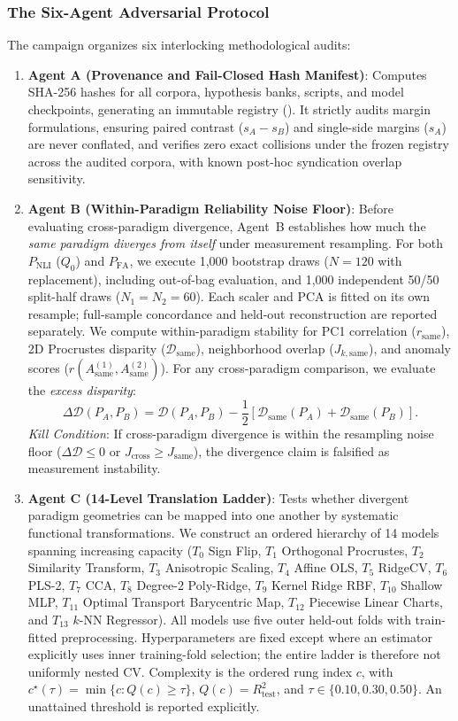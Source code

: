 \subsubsection{The Six-Agent Adversarial Protocol}
The campaign organizes six interlocking methodological audits:
\begin{enumerate}
    \item \textbf{Agent A (Provenance and Fail-Closed Hash Manifest)}: Computes SHA-256 hashes for all corpora, hypothesis banks, scripts, and model checkpoints, generating an immutable registry (). It strictly audits margin formulations, ensuring paired contrast ($s_A - s_B$) and single-side margins ($s_A$) are never conflated, and verifies zero exact collisions under the frozen registry across the audited corpora, with known post-hoc syndication overlap sensitivity.
    \item \textbf{Agent B (Within-Paradigm Reliability Noise Floor)}: Before evaluating cross-paradigm divergence, Agent~B establishes how much the \emph{same paradigm diverges from itself} under measurement resampling. For both $P_{\mathrm{NLI}}$ ($Q_0$) and $P_{\mathrm{FA}}$, we execute 1,000 bootstrap draws ($N=120$ with replacement), including out-of-bag evaluation, and 1,000 independent 50/50 split-half draws ($N_1=N_2=60$). Each scaler and PCA is fitted on its own resample; full-sample concordance and held-out reconstruction are reported separately. We compute within-paradigm stability for PC1 correlation ($r_{\text{same}}$), 2D Procrustes disparity ($\mathcal{D}_{\text{same}}$), neighborhood overlap ($J_{k,\text{same}}$), and anomaly scores ($r(A_{\text{same}}^{(1)}, A_{\text{same}}^{(2)})$). For any cross-paradigm comparison, we evaluate the \emph{excess disparity}:
    \begin{equation}
        \Delta \mathcal{D}(P_A, P_B) = \mathcal{D}(P_A, P_B) - \frac{1}{2}\left[\mathcal{D}_{\text{same}}(P_A) + \mathcal{D}_{\text{same}}(P_B)\right].
    \end{equation}
    \emph{Kill Condition}: If cross-paradigm divergence is within the resampling noise floor ($\Delta \mathcal{D} \le 0$ or $J_{\text{cross}} \ge J_{\text{same}}$), the divergence claim is falsified as measurement instability.
    \item \textbf{Agent C (14-Level Translation Ladder)}: Tests whether divergent paradigm geometries can be mapped into one another by systematic functional transformations. We construct an ordered hierarchy of 14 models spanning increasing capacity ($T_0$ Sign Flip, $T_1$ Orthogonal Procrustes, $T_2$ Similarity Transform, $T_3$ Anisotropic Scaling, $T_4$ Affine OLS, $T_5$ RidgeCV, $T_6$ PLS-2, $T_7$ CCA, $T_8$ Degree-2 Poly-Ridge, $T_9$ Kernel Ridge RBF, $T_{10}$ Shallow MLP, $T_{11}$ Optimal Transport Barycentric Map, $T_{12}$ Piecewise Linear Charts, and $T_{13}$ $k$-NN Regressor). All models use five outer held-out folds with train-fitted preprocessing. Hyperparameters are fixed except where an estimator explicitly uses inner training-fold selection; the entire ladder is therefore not uniformly nested CV. Complexity is the ordered rung index $c$, with $c^\star(\tau)=\min\{c:Q(c)\geq\tau\}$, $Q(c)=R^2_{\mathrm{test}}$, and $\tau\in\{0.10,0.30,0.50\}$. An unattained threshold is reported explicitly.

\end{enumerate}
